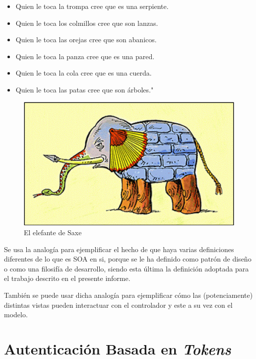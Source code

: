     \begin{itemize}
        \item Quien le toca la trompa cree que es una serpiente.
        \item Quien le toca los colmillos cree que son lanzas.
        \item Quien le toca las orejas cree que son abanicos.
        \item Quien le toca la panza cree que es una pared.
        \item Quien le toca la cola cree que es una cuerda.
        \item Quien le toca	las patas cree que son árboles."
    \end{itemize}
    

    \begin{figure}
        \begin{center}
            \includegraphics[scale=.75]{figures/Elefante}
        \end{center}
        \caption {El elefante de Saxe}
    \end{figure}

    Se usa la analogía para ejemplificar el hecho de que haya varias definiciones diferentes de lo que es SOA en si, porque se le ha definido como patrón de diseño o como una filosifía de desarrollo, siendo esta última la definición adoptada para el trabajo descrito en el presente informe.
    
    También se puede usar dicha analogía para ejemplificar cómo las (potenciamente) distintas vistas pueden interactuar con el controlador y este a su vez con el modelo.


    \section{Autenticación Basada en \textit{Tokens}}
    
